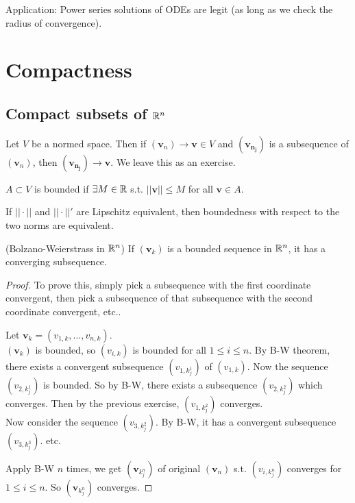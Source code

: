 \documentclass[a4paper]{article}
\begin{document}
Application: Power series solutions of ODEs are legit (as long as we check the radius of convergence).

\newpage

\section{Compactness}

\subsection{Compact subsets of $\mathbb{R}^n$}

Let $V$ be a normed space. Then if $\left(\mathbf{v}_n\right) \to \mathbf{v} \in V$ and $\left(\mathbf{v_{n_j}}\right) $ is a subsequence of $\left(\mathbf{v}_n\right)$, then $\left(\mathbf{v_{n_j}}\right) \to \mathbf{v}$. We leave this as an exercise.

\begin{defi}
$A \subset V$ is bounded if $\exists M \in \mathbb{R}$ s.t. $||\mathbf{v}|| \leq M$ for all $\mathbf{v} \in A$.

If $||\cdot||$ and $||\cdot||'$ are Lipschitz equivalent, then boundedness with respect to the two norms are equivalent.
\end{defi}

\begin{coro} (Bolzano-Weierstrass in $\mathbb{R}^n$)
If $\left(\mathbf{v}_k\right)$ is a bounded sequence in $\mathbb{R}^n$, it has a converging subsequence.
\begin{proof}
To prove this, simply pick a subsequence with the first coordinate convergent, then pick a subsequence of that subsequence with the second coordinate convergent, etc..

Let $\mathbf{v}_k = \left(v_{1,k},...,v_{n,k}\right)$.\\
$\left(\mathbf{v}_k\right)$ is bounded, so $\left(v_{i,k}\right)$ is bounded for all $1\leq i\leq n$. By B-W theorem, there exists a convergent subsequence $\left(v_{1,k_j^1}\right)$ of $\left(v_{1,k}\right)$. Now the sequence $\left(v_{2,k_j^1}\right)$ is bounded. So by B-W, there exists a subsequence $\left(v_{2,k_j^2}\right)$ which converges. Then by the previous exercise, $\left(v_{1,k_j^2}\right)$ converges.\\
Now consider the sequence $\left(v_{3,k_j^2}\right)$. By B-W, it has a convergent subsequence $\left(v_{3,k_j^3}\right)$. etc.

Apply B-W $n$ times, we get $\left(\mathbf{v}_{k_j^n}\right)$ of original $\left(\mathbf{v}_n\right)$ s.t. $\left(v_{i,k_j^n}\right)$ converges for $1\leq i\leq n$. So $\left(\mathbf{v}_{k_j^n}\right)$ converges.
\end{proof}
\end{coro}
\end{document}
